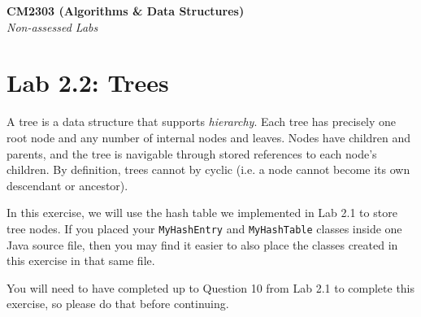 \documentclass[11pt,a4paper]{report}
\begin{document}
\noindent\Large\textbf{CM2303 (Algorithms \& Data Structures)}\\
\noindent\large\textit{Non-assessed Labs}
\vskip30pt

\section*{Lab 2.2: Trees}

A tree is a data structure that supports \textit{hierarchy}. Each tree has precisely one root node and any number of internal nodes and leaves. Nodes have children and parents, and the tree is navigable through stored references to each node's children. By definition, trees cannot by cyclic (i.e. a node cannot become its own descendant or ancestor).

In this exercise, we will use the hash table we implemented in Lab 2.1 to store tree nodes. If you placed your \texttt{MyHashEntry} and \texttt{MyHashTable} classes inside one Java source file, then you may find it easier to also place the classes created in this exercise in that same file.

You will need to have completed up to Question 10 from Lab 2.1 to complete this exercise, so please do that before continuing.
\end{document}
